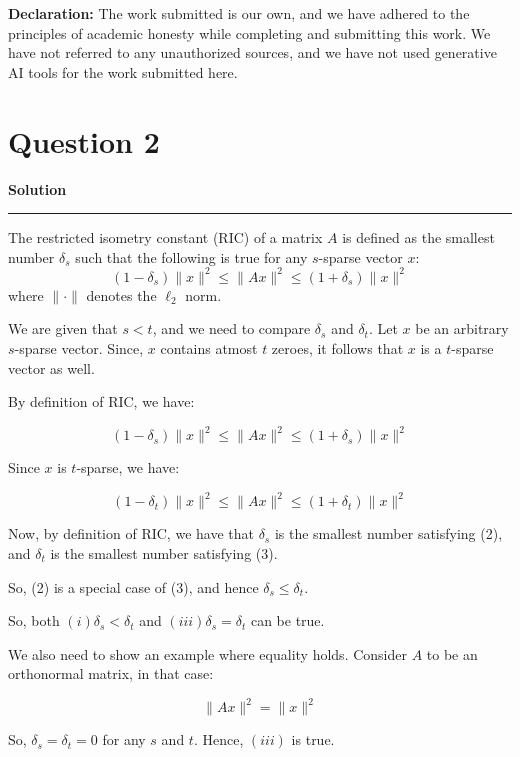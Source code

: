 \documentclass[a4paper,12pt]{article}
\title{\cooltitle{CS754 Assignment-1}}
\author{{\bf Saksham Rathi, Ekansh Ravi Shankar, Kshitij Vaidya}}
\date{}
\newenvironment{solution}[2][]{%
    \begin{mdframed}[linecolor=blue!70!black, linewidth=2pt, roundcorner=10pt, backgroundcolor=yellow!10!white, skipabove=12pt, skipbelow=12pt]%
        \textbf{\large #2}
        \par\noindent\rule{\textwidth}{0.4pt}
}{
    \end{mdframed}
}
\begin{document}
\maketitle
\textbf{Declaration:} The work submitted is our own, and
we have adhered to the principles of academic honesty while completing and submitting this work. We have not referred to any unauthorized sources, and we have not used generative AI tools for the work submitted here.



\section*{Question 2}

\begin{solution}{Solution}
  The restricted isometry constant (RIC) of a
 matrix $A$ is defined as the smallest number $\delta_s$ such that the following is true for any $s$-sparse vector $x$:
  \begin{equation}
    (1-\delta_s) \lVert x \rVert^2 \leq \lVert Ax \rVert^2 \leq (1+\delta_s) \lVert x \rVert^2
  \end{equation}
  where $\lVert \cdot \rVert$ denotes the $\ell_2$ norm. 

  We are given that $s < t$, and we need to compare $\delta_s$ and $\delta_t$. Let $x$ be an arbitrary $s$-sparse vector. Since, $x$ contains atmost $t$ zeroes, it follows that $x$ is a $t$-sparse vector as well. 

  By definition of RIC, we have:

  \begin{equation}
    (1-\delta_s) \lVert x \rVert^2 \leq \lVert Ax \rVert^2 \leq (1+\delta_s) \lVert x \rVert^2
  \end{equation}

  Since $x$ is $t$-sparse, we have:

  \begin{equation}
    (1-\delta_t) \lVert x \rVert^2 \leq \lVert Ax \rVert^2 \leq (1+\delta_t) \lVert x \rVert^2
  \end{equation}

  Now, by definition of RIC, we have that $\delta_s$ is the smallest number satisfying (2), and $\delta_t$ is the smallest number satisfying (3). 
  
  So, (2) is a special case of (3), and hence $\delta_s \leq \delta_t$.

  So, both $(i) \delta_s < \delta_t$ and $(iii) \delta_s = \delta_t$ can be true.


  We also need to show an example where equality holds. Consider $A$ to be an orthonormal matrix, in that case:

  \begin{equation}
    \lVert Ax \rVert^2 = \lVert x \rVert^2
  \end{equation}

  So, $\delta_s = \delta_t = 0$ for any $s$ and $t$. Hence, $(iii)$ is true.
\end{solution}
\end{document}
